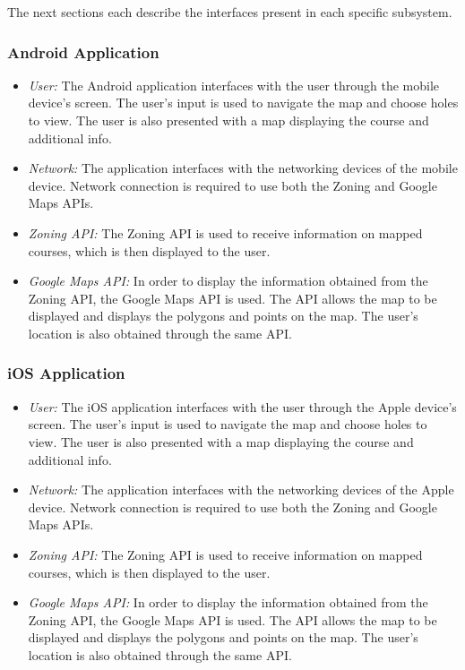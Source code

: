 \documentclass{article}
\begin{document}
    The next sections each describe the interfaces present in each specific
    subsystem.

    \subsubsection{Android Application}

    \begin{itemize}
        \item \textit{User:} The Android application interfaces with the user
            through the mobile device's screen. The user's input is used to
            navigate the map and choose holes to view. The user is also
            presented with a map displaying the course and additional info.
        \item \textit{Network:} The application interfaces with the networking
            devices of the mobile device. Network connection is required to use
            both the Zoning and Google Maps APIs.
        \item \textit{Zoning API:} The Zoning API is used to receive
            information on mapped courses, which is then displayed to the user.
        \item \textit{Google Maps API:} In order to display the information
            obtained from the Zoning API, the Google Maps API is used. The API
            allows the map to be displayed and displays the polygons and points
            on the map. The user's location is also obtained through the same
            API.
    \end{itemize}

    \subsubsection{iOS Application}

    \begin{itemize}
        \item \textit{User:} The iOS application interfaces with the user
            through the Apple device's screen. The user's input is used to
            navigate the map and choose holes to view. The user is also
            presented with a map displaying the course and additional info.
        \item \textit{Network:} The application interfaces with the networking
            devices of the Apple device. Network connection is required to use
            both the Zoning and Google Maps APIs.
        \item \textit{Zoning API:} The Zoning API is used to receive
            information on mapped courses, which is then displayed to the user.
        \item \textit{Google Maps API:} In order to display the information
            obtained from the Zoning API, the Google Maps API is used. The API
            allows the map to be displayed and displays the polygons and points
            on the map. The user's location is also obtained through the same
            API.
    \end{itemize}
\end{document}
